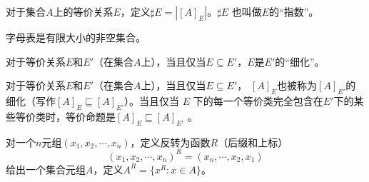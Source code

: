 \begin{definition}[等价类的指数]
    对于集合$A$上的等价关系$E$，定义$\sharp E = | [A]_E |$。$\sharp E$ 也叫做$E$的“指数”。
\end{definition}


\begin{definition}[字母表] %
    字母表是有限大小的非空集合。
\end{definition}



\begin{definition}[等价关系的细化]
    对于等价关系$E$和$E'$（在集合$A$上），当且仅当$E \subseteq E'$，$E$是$E'$的“细化”。
\end{definition}

\begin{definition}
    对于等价关系$E$和$E'$（在集合$A$上），当且仅当$ E \subseteq E' $， $[A]_E$也被称为$ [A]_{E'} $的细化（写作$ [A]_E \sqsubseteq [A]_{E'} $）。当且仅当 $E$ 下的每一个等价类完全包含在$E'$下的某些等价类时，等价命题是$ [A]_E \sqsubseteq [A]_{E'} $ 。
\end{definition}


\begin{definition}[元组和关系反转]
    对一个$n$元组$(x_1,x_2,\cdots,x_n)$，定义反转为函数$R$（后缀和上标）
    $$ (x_1,x_2,\cdots,x_n)^R = (x_n,\cdots,x_2,x_1) $$
给出一个集合元组$A$，定义$A^R = \{ x^R:x\in A \}$。
\end{definition}


